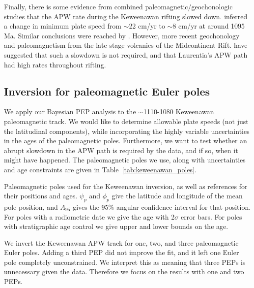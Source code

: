 \documentclass[preprint,12pt,authoryear]{elsarticle}
\begin{document}
Finally, there is some evidence from combined paleomagnetic/geochonologic studies that
the APW rate during the Keweenawan rifting slowed down.
\citet{davis1997geochronology} inferred a change in minimum plate speed from $\sim$22 cm/yr
to $\sim$8 cm/yr at around 1095 Ma. Similar conclusions were reached by \citet{swanson2009no}.
However, more recent geochonology and paleomagnetism from the late stage volcanics
of the Midcontinent Rift. \citet{fairchild2016end} have suggested that such a
slowdown is not required, and that Laurentia's APW path had high rates throughout rifting.

\subsection{Inversion for paleomagnetic Euler poles}

We apply our Bayesian PEP analysis to the $\sim$1110-1080 Keweenawan paleomagnetic track.
We would like to determine allowable plate speeds (not just the latitudinal components), while
incorporating the highly variable uncertainties in the ages of the paleomagnetic poles.
Furthermore, we want to test whether an abrupt slowdown in the APW path is required by the data,
and if so, when it might have happened.
The paleomagnetic poles we use, along with uncertainties and age constraints are given in Table~\ref{tab:keweenawan_poles}.

\begin{landscape}
\begin{table}
\scriptsize

\caption[Paleomagnetic poles used for the Keweenawan inversion.]{Paleomagnetic poles used for the Keweenawan inversion, as well as references for their positions and ages. 
$\psi_p$ and $\phi_p$ give the latitude and longitude of the mean pole position, and $A_{95}$ gives the 95\% angular confidence interval for that position.
For poles with a radiometric date we give the age with 2$\sigma$ error bars.
For poles with stratigraphic age control we give upper and lower bounds on the age.}
\label{tab:keweenawan_poles}
\end{table}
\end{landscape}

We invert the Keweenawan APW track for one, two, and three paleomagnetic Euler poles.
Adding a third PEP did not improve the fit, and it left one Euler pole completely unconstrained.
We interpret this as meaning that three PEPs is unnecessary given the data. Therefore we focus
on the results with one and two PEPs.
\end{document}
